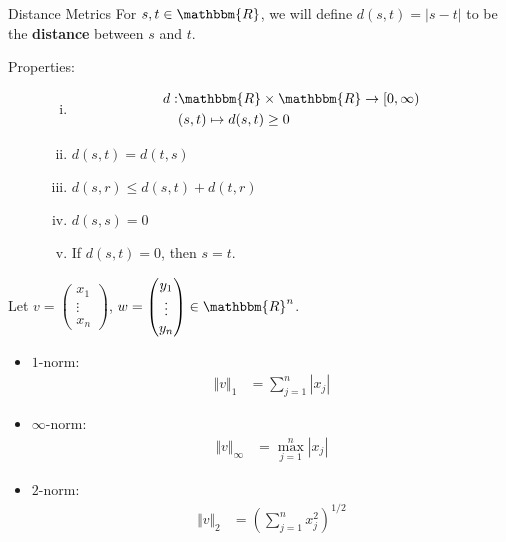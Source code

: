 \documentclass[10pt]{extarticle}
\newcommand{\R}{\mathbbm{R}}
\begin{document}
  \begin{problem}{Distance Metrics}
    For $s,t\in\R$, we will define $d(s,t) = |s-t|$ to be the \textbf{distance} between $s$ and $t$.

    \begin{description}
      \item[Properties:]\hfill
        \begin{enumerate}[(i)]
          \item 
          \begin{align*}
            d: &\R \times \R \rightarrow [0,\infty)\\
               &(s,t) \mapsto d(s,t) \geq 0
          \end{align*}
          \item $d(s,t) = d(t,s)$
          \item $d(s,r) \leq d(s,t) + d(t,r)$
          \item $d(s,s) = 0$
          \item If $d(s,t) = 0$, then $s = t$.
        \end{enumerate}
    \end{description}
    Let $v = \begin{pmatrix}x_1\\\vdots\\x_n\end{pmatrix}$, $ w = \begin{pmatrix}y_1\\\vdots\\y_n\end{pmatrix} \in \R^n$.
    \begin{itemize}
      \item  $1$-norm:
        \begin{align*}
          \Vert v \Vert_1 &= \sum_{j = 1}^{n} |x_j|
        \end{align*}
      \item $\infty$-norm:
        \begin{align*}
          \Vert v \Vert_{\infty} &= \max_{j=1}^{n} |x_j|
        \end{align*}
      \item $2$-norm:
        \begin{align*}
          \Vert v \Vert_2 &= \left(\sum_{j = 1}^{n} x_j^2\right)^{1/2}
        \end{align*}
    \end{itemize}
  \end{problem}
\end{document}
